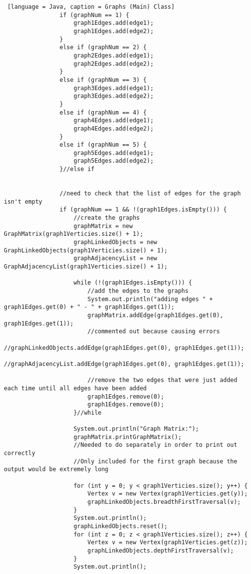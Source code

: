 \documentclass{article}
\begin{document}
\begin{lstlisting} [language = Java, caption = Graphs (Main) Class]
                if (graphNum == 1) {
                    graph1Edges.add(edge1);
                    graph1Edges.add(edge2);
                }
                else if (graphNum == 2) {
                    graph2Edges.add(edge1);
                    graph2Edges.add(edge2);
                }
                else if (graphNum == 3) {
                    graph3Edges.add(edge1);
                    graph3Edges.add(edge2);
                }
                else if (graphNum == 4) {
                    graph4Edges.add(edge1);
                    graph4Edges.add(edge2);
                }
                else if (graphNum == 5) {
                    graph5Edges.add(edge1);
                    graph5Edges.add(edge2);
                }//else if


                //need to check that the list of edges for the graph isn't empty
                if (graphNum == 1 && !(graph1Edges.isEmpty())) {
                    //create the graphs 
                    graphMatrix = new GraphMatrix(graph1Verticies.size() + 1);
                    graphLinkedObjects = new GraphLinkedObjects(graph1Verticies.size() + 1);
                    graphAdjacencyList = new GraphAdjacencyList(graph1Verticies.size() + 1);

                    while (!(graph1Edges.isEmpty())) {
                        //add the edges to the graphs
                        System.out.println("adding edges " + graph1Edges.get(0) + " - " + graph1Edges.get(1));
                        graphMatrix.addEdge(graph1Edges.get(0), graph1Edges.get(1));
                        //commented out because causing errors
                        //graphLinkedObjects.addEdge(graph1Edges.get(0), graph1Edges.get(1));
                        //graphAdjacencyList.addEdge(graph1Edges.get(0), graph1Edges.get(1));

                        //remove the two edges that were just added each time until all edges have been added 
                        graph1Edges.remove(0);
                        graph1Edges.remove(0);
                    }//while

                    System.out.println("Graph Matrix:");
                    graphMatrix.printGraphMatrix();
                    //Needed to do separately in order to print out correctly
                    //Only included for the first graph because the output would be extremely long
                    
                    for (int y = 0; y < graph1Verticies.size(); y++) {
                        Vertex v = new Vertex(graph1Verticies.get(y));
                        graphLinkedObjects.breadthFirstTraversal(v);
                    }
                    System.out.println();
                    graphLinkedObjects.reset();
                    for (int z = 0; z < graph1Verticies.size(); z++) {
                        Vertex v = new Vertex(graph1Verticies.get(z));
                        graphLinkedObjects.depthFirstTraversal(v);
                    }
                    System.out.println();
                    


\end{lstlisting}
\end{document}
